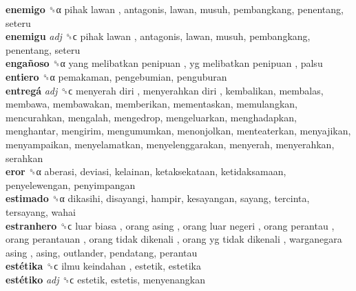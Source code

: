 \textbf{enemigo} ␝α   pihak lawan , antagonis, lawan, musuh, pembangkang, penentang, seteru  \\
\textbf{enemigu} \emph{adj}  ␝ϲ   pihak lawan , antagonis, lawan, musuh, pembangkang, penentang, seteru  \\
\textbf{engañoso} ␝α   yang melibatkan penipuan ,  yg melibatkan penipuan , palsu  \\
\textbf{entiero} ␝α  pemakaman, pengebumian, penguburan  \\
\textbf{entregá} \emph{adj}  ␝ϲ   menyerah diri ,  menyerahkan diri , kembalikan, membalas, membawa, membawakan, memberikan, mementaskan, memulangkan, mencurahkan, mengalah, mengedrop, mengeluarkan, menghadapkan, menghantar, mengirim, mengumumkan, menonjolkan, menteaterkan, menyajikan, menyampaikan, menyelamatkan, menyelenggarakan, menyerah, menyerahkan, serahkan  \\
\textbf{eror} ␝α  aberasi, deviasi, kelainan, ketaksekataan, ketidaksamaan, penyelewengan, penyimpangan  \\
\textbf{estimado} ␝α  dikasihi, disayangi, hampir, kesayangan, sayang, tercinta, tersayang, wahai  \\
\textbf{estranhero} ␝ϲ   luar biasa ,  orang asing ,  orang luar negeri ,  orang perantau ,  orang perantauan ,  orang tidak dikenali ,  orang yg tidak dikenali ,  warganegara asing , asing, outlander, pendatang, perantau  \\
\textbf{estétika} ␝ϲ   ilmu keindahan , estetik, estetika  \\
\textbf{estétiko} \emph{adj}  ␝ϲ  estetik, estetis, menyenangkan  \\
